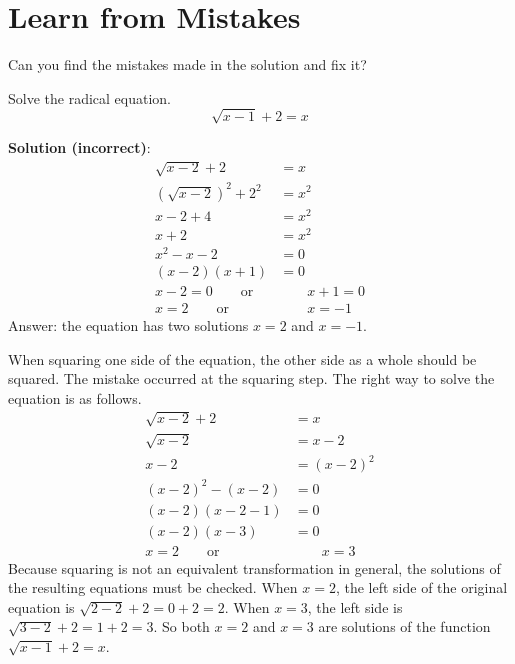 \documentclass[
  en,11pt]{elegantbook}
\renewenvironment{example}[1][]{
  \refstepcounter{exam}
  \par\noindent\textbf{\color{main}{\examplename} \theexam #1}
  \rmfamily
}{
  \par\ignorespacesafterend
}
\begin{document}
\hypertarget{learn-from-mistakes}{%
\section{Learn from Mistakes}\label{learn-from-mistakes}}

\begin{example}

Can you find the mistakes made in the solution and fix it?

Solve the radical equation.
\[\sqrt{x-1}+2=x\]

\textbf{Solution (incorrect)}:
\[
\begin{aligned}
\sqrt{x-2}+2&=x\\
(\sqrt{x-2})^2+2^2&=x^2\\
x-2+4&=x^2\\
x+2&=x^2\\
x^2-x-2&=0\\
(x-2)(x+1)&=0\\
x-2=0 \qquad\text{or}& \qquad x+1=0\\
x=2 \qquad\text{or}&\qquad x=-1
\end{aligned}
\]
Answer: the equation has two solutions \(x=2\) and \(x=-1\).

\end{example}

\begin{solution}

When squaring one side of the equation, the other side as a whole should be squared. The mistake occurred at the squaring step. The right way to solve the equation is as follows.
\[
\begin{aligned}
\sqrt{x-2}+2&=x\\
\sqrt{x-2}&=x-2\\
x-2&=(x-2)^2\\
(x-2)^2-(x-2)&=0\\
(x-2)(x-2-1)&=0\\
(x-2)(x-3)&=0\\
x=2 \qquad\text{or}&\qquad x=3
\end{aligned}
\]
Because squaring is not an equivalent transformation in general, the solutions of the resulting equations must be checked. When \(x=2\), the left side of the original equation is \(\sqrt{2-2}+2=0+2=2\). When \(x=3\), the left side is \(\sqrt{3-2}+2=1+2=3\). So both \(x=2\) and \(x=3\) are solutions of the function \(\sqrt{x-1}+2=x\).
\end{solution}

\newpage
\end{document}

